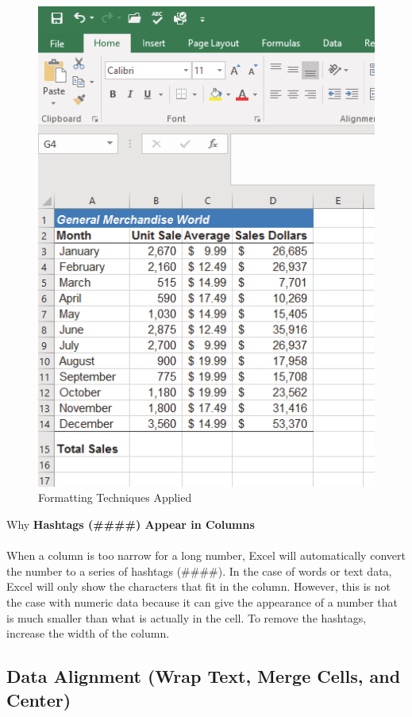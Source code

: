 \begin{figure}[H]
	\centering
	\includegraphics[width=\maxwidth{.95\linewidth}]{gfx/ch01_fig37}
	\caption{Formatting Techniques Applied}
	\label{01:fig37}
\end{figure}

\begin{center}
	\begin{infobox}{Why}
		\textbf{Hashtags (\#\#\#\#) Appear in Columns}
		\\
		\\
		When a column is too narrow for a long number, Excel will automatically convert the number to a series of hashtags (\#\#\#\#). In the case of words or text data, Excel will only show the characters that fit in the column. However, this is not the case with numeric data because it can give the appearance of a number that is much smaller than what is actually in the cell. To remove the hashtags, increase the width of the column.
	\end{infobox}
\end{center}


\subsection{Data Alignment (Wrap Text, Merge Cells, and Center)}

